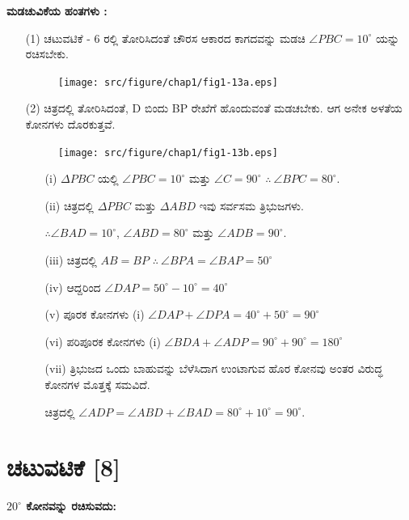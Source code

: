 \noindent
\textbf{ಮಡಚುವಿಕೆಯ ಹಂತಗಳು :}
\begin{enumerate}
\item[(1)] ಚಟುವಟಿಕೆ - 6 ರಲ್ಲಿ ತೋರಿಸಿದಂತೆ ಚೌರಸ ಆಕಾರದ ಕಾಗದವನ್ನು ಮಡಚಿ $\angle PBC = 10^\circ$ ಯನ್ನು ರಚಿಸಬೇಕು.
\begin{figure}[H]
\centering
\texttt{[image: src/figure/chap1/fig1-13a.eps]}
\end{figure}

\item[(2)] ಚಿತ್ರದಲ್ಲಿ ತೋರಿಸಿದಂತೆ, D ಬಿಂದು BP ರೇಖೆಗೆ ಹೊಂದುವಂತೆ ಮಡಚಬೇಕು. ಆಗ ಅನೇಕ ಅಳತೆಯ ಕೋನಗಳು ದೊರಕುತ್ತವೆ. 
\begin{figure}[H]
\centering
\texttt{[image: src/figure/chap1/fig1-13b.eps]}
\end{figure}
\begin{itemize}
\item[(i)] $\Delta PBC$ ಯಲ್ಲಿ $\angle PBC =  10^\circ$ ಮತ್ತು $\angle C =90^\circ$  $\therefore ~ \angle BPC = 80^\circ$.

\item[(ii)] ಚಿತ್ರದಲ್ಲಿ $\Delta PBC$ ಮತ್ತು $\Delta ABD$ ಇವು ಸರ್ವಸಮ ತ್ರಿಭುಜಗಳು.

$\therefore \angle BAD = 10^\circ$, $\angle ABD = 80^\circ$ ಮತ್ತು $\angle ADB = 90^\circ$.

\item[(iii)] ಚಿತ್ರದಲ್ಲಿ $AB = BP$ \quad $\therefore ~ \angle BPA = \angle BAP = 50^\circ$

\item[(iv)] ಆದ್ದರಿಂದ $\angle DAP = 50^\circ - 10^\circ = 40^\circ$

\item[(v)] ಪೂರಕ ಕೋನಗಳು (i) $\angle DAP + \angle DPA = 40^\circ + 50^\circ = 90^\circ$

\item[(vi)] ಪರಿಪೂರಕ ಕೋನಗಳು  (i) $\angle BDA + \angle ADP = 90^\circ + 90^\circ = 180^\circ $

\item[(vii)] ತ್ರಿಭುಜದ ಒಂದು ಬಾಹುವನ್ನು ಬೆಳೆಸಿದಾಗ ಉಂಟಾಗುವ ಹೊರ ಕೋನವು ಅಂತರ ವಿರುದ್ಧ ಕೋನಗಳ ಮೊತ್ತಕ್ಕೆ ಸಮವಿದೆ. 

ಚಿತ್ರದಲ್ಲಿ $\angle ADP = \angle ABD + \angle BAD = 80^\circ + 10^\circ = 90^\circ$.
\end{itemize}
\end{enumerate}

\section*{ಚಟುವಟಿಕೆ [8]} \textbf{$20^\circ$ ಕೋನವನ್ನು ರಚಿಸುವದು: }

